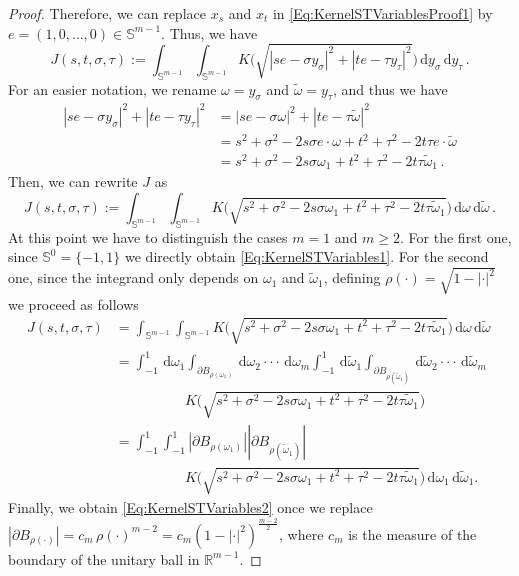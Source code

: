 \documentclass[12pt,reqno]{amsart}
\theoremstyle{definition}
\theoremstyle{remark}
\newcommand{\con}[1]{\mathbb{#1}}
\newcommand{\R}{\con{R}} %
\newcommand{\Sph}{\con{S}} %
\renewcommand{\d}{\,\mathrm{d}} %
\numberwithin{equation}{section}
\begin{document}
\begin{proof}
	Therefore, we can replace $x_s$ and $x_t$ in \eqref{Eq:KernelSTVariablesProof1} by $e =(1,0,\ldots,0) \in \Sph^{m-1}$. Thus, we have
	\begin{equation*}
	J(s,t,\sigma, \tau) := \int_{\Sph^{m-1}}  \int_{\Sph^{m-1}} K\Big( \sqrt{|s e - \sigma y_\sigma|^2 + |t e - \tau y_\tau|^2 }\Big) \d y_\sigma \d y_\tau \,.
	\end{equation*}
	For an easier notation, we rename $\omega = y_\sigma$ and $\tilde\omega = y_\tau$, and thus we have
	\begin{align*}
	|s e - \sigma y_\sigma|^2 + |t e - \tau y_\tau|^2 &= |s e - \sigma \omega|^2 + |t e - \tau \tilde\omega|^2\\
	&= s^2 +\sigma^2 - 2 s \sigma e \cdot \omega + t^2 + \tau^2 - 2 t \tau e\cdot \tilde\omega \\
	&= s^2 +\sigma^2 - 2 s \sigma \omega_1 + t^2 + \tau^2 - 2t \tau\tilde\omega_1\,.
	\end{align*}
	Then, we can rewrite $J$ as
	\begin{equation*}
	\label{Eq:KernelSTVariablesProof3}
	J(s,t,\sigma, \tau) := \int_{\Sph^{m-1}}  \int_{\Sph^{m-1}} K\Big( \sqrt{s^2+\sigma^2- 2 s \sigma \omega_1 + t^2 + \tau^2 - 2t \tau\tilde\omega_1}\Big) \d \omega \d \tilde\omega \,.
	\end{equation*}
	At this point we have to distinguish the cases $m=1$ and $m\geq 2$. For the first one, since
	$\Sph^{0} = \{-1,1\}$ we directly obtain \eqref{Eq:KernelSTVariables1}. For the second one,
	since the integrand only depends on $\omega_1$ and $\tilde\omega_1$, defining $\rho(\cdot) = \sqrt{1-|\cdot|^2}$ we proceed as follows
	\begin{align*}
	\label{Eq:KernelSTVariablesProof4}
	J(s,t,\sigma, \tau) &= \int_{\Sph^{m-1}}  \int_{\Sph^{m-1}} K\Big( \sqrt{s^2+\sigma^2- 2 s \sigma \omega_1 + t^2 + \tau^2 - 2t \tau\tilde\omega_1}\Big) \d \omega \d \tilde\omega \,\\
	&= \int_{-1}^1 \d \omega_1 \int_{\partial B_{\rho(\omega_1)}} \d \omega_2\cdot\cdot\cdot\d \omega_m \int_{-1}^1 \d \tilde\omega_1 \int_{\partial B_{\rho(\tilde\omega_1)}} \d \tilde\omega_2\cdot\cdot\cdot\d \tilde\omega_m  \\
	& \quad \quad \quad \quad \quad K\Big( \sqrt{s^2+\sigma^2- 2 s \sigma \omega_1 + t^2 + \tau^2 - 2t \tau\tilde\omega_1}\Big) \, \\
	&= \int_{-1}^1 \int_{-1}^1  |\partial B_{\rho(\omega_1)}| |\partial B_{\rho(\tilde\omega_1)}|\,\\
	& \quad \quad \quad \quad \quad K\Big( \sqrt{s^2+\sigma^2- 2 s \sigma \omega_1 + t^2 + \tau^2 - 2t \tau\tilde\omega_1}\Big) \d \omega_1 \d \tilde\omega_1 .
	\end{align*}
	Finally, we obtain \eqref{Eq:KernelSTVariables2} once we replace
	$|\partial B_{\rho(\cdot)}|=c_m\,\rho(\cdot)^{m-2} = c_m (1-|\cdot|^2)^\frac{m-2}{2}$, where $c_m$ is the measure of the boundary of the unitary ball in $\R^{m-1}$.
\end{proof}
\end{document}
